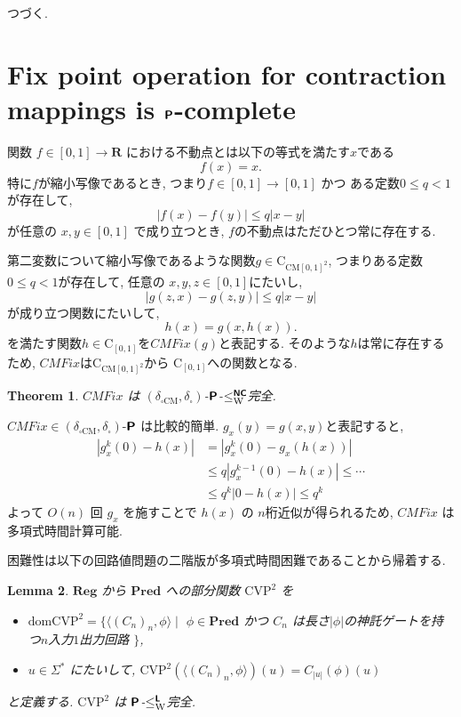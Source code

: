 \documentclass[12pt,a4paper]{article}
\newtheorem{theorem}{Theorem}%
\newtheorem{lemma}[theorem]{Lemma}
\theoremstyle{definition}
\theoremstyle{remark}
\newcommand{\R}{\mathbf R}
\newcommand{\deltabox}{\delta _\square}
\newcommand{\deltaboxCM}{\delta _{\square \mathrm{CM}}}
\newcommand{\classtwofont}[1]{\text{\bfseries \sffamily \upshape #1}}
\newcommand{\classLtwo}{\classtwofont{L}}
\newcommand{\classNCtwo}{\classtwofont{NC}}
\newcommand{\classPtwo}{\classtwofont{P}}
\newcommand{\redNCW}{\leq ^{\classNCtwo}_{\mathrm W}}
\newcommand{\redLW}{\leq ^{\classLtwo}_{\mathrm W}}
\newcommand{\classC}{\mathrm C}
\newcommand{\funReg}{\mathbf{Reg}}
\newcommand{\funPred}{\mathbf{Pred}}
\newcommand{\OpCMFix}{\mathit{CMFix}}
\newcommand{\OpCVP}{\mathrm{CVP}^2}
\begin{document}
つづく.



\section{Fix point operation for contraction mappings is $\classPtwo$-complete}

関数 $f \in [0,1] \to \R$ における不動点とは以下の等式を満たす$x$である
\[
 f(x) = x.
\]
特に$f$が縮小写像であるとき, つまり$f \in [0, 1] \to [0, 1]$ かつ
ある定数$0 \le q < 1$が存在して,
\[
 |f(x) - f(y)| \le q|x - y|
\]
が任意の $x, y \in [0, 1]$ で成り立つとき, $f$の不動点はただひとつ常に存在する.

第二変数について縮小写像であるような関数$g \in \classC_{\mathrm{CM}[0,1]^2}$,
つまりある定数$0 \le q < 1$が存在して, 任意の $x, y, z \in [0, 1]$にたいし,
\[
 |g(z, x) - g(z, y)| \le q|x - y|
\]
が成り立つ関数にたいして,
\[
h(x) = g(x, h(x)).
\]
を満たす関数$h \in \classC_{[0,1]}$を$\OpCMFix(g)$と表記する.
そのような$h$は常に存在するため, $\OpCMFix$は$\classC_{\mathrm{CM}[0,1]^2}$から
$\classC_{[0,1]}$への関数となる.


\begin{theorem}
$\OpCMFix$ は $(\deltaboxCM, \deltabox)$-$\classPtwo$-$\redNCW$完全.
\end{theorem}

$\OpCMFix \in (\deltaboxCM, \deltabox)$-$\classPtwo$ は比較的簡単.
$g_x(y) = g(x, y)$と表記すると,
\begin{align*}
 |g^k_x(0) - h(x)| 
 & = |g^k_x(0) - g_x(h(x))|
 \\
 & \le q |g^{k-1}_x(0) - h(x)| \le \cdots
 \\
 & \le q ^ k |0 - h(x)| \le q ^ k
\end{align*}
よって $O(n)$ 回 $g_x$ を施すことで $h(x)$ の $n$桁近似が得られるため, 
$\OpCMFix$ は多項式時間計算可能.

困難性は以下の回路値問題の二階版が多項式時間困難であることから帰着する.

\begin{lemma}
$\funReg$ から $\funPred$ への部分関数 $\OpCVP$ を
\begin{itemize}
 \item $\mathrm{dom} \OpCVP = \{\langle (C_n)_n, \phi\rangle \mid$
$\phi \in \funPred$ かつ $C_n$ は長さ$|\phi|$の神託ゲートを持つ$n$入力$1$出力回路  $\}$,
 \item $u \in \Sigma^*$ にたいして, $\OpCVP(\langle (C_n)_n, \phi \rangle)(u) = C_{|u|}(\phi)(u)$
\end{itemize}
 と定義する. $\OpCVP$ は $\classPtwo$-$\redLW$完全.
\end{lemma}
\end{document}
